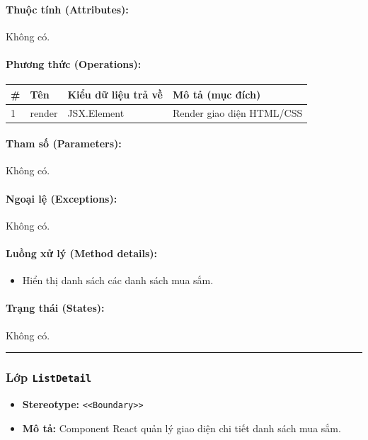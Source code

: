 \documentclass[12pt,a4paper]{article}
\begin{document}
\paragraph{Thuộc tính (Attributes):}
Không có.

\paragraph{Phương thức (Operations):}
\begin{longtable}{|p{0.6cm}|p{3.8cm}|p{2.6cm}|p{6.5cm}|}
\hline
\textbf{\#} & \textbf{Tên} & \textbf{Kiểu dữ liệu trả về} & \textbf{Mô tả (mục đích)} \\ \hline
\endhead
1 & render & JSX.Element & Render giao diện HTML/CSS \\ \hline
\end{longtable}

\paragraph{Tham số (Parameters):}
Không có.

\paragraph{Ngoại lệ (Exceptions):}
Không có.

\paragraph{Luồng xử lý (Method details):}
\begin{itemize}[leftmargin=*]
    \item Hiển thị danh sách các danh sách mua sắm.
\end{itemize}


\paragraph{Trạng thái (States):}
Không có.

\vskip 0.5cm
\noindent\rule{\textwidth}{0.5pt}
\vskip 0.5cm

\subsubsection{Lớp \texttt{ListDetail}}
\begin{itemize}[leftmargin=*]
    \item \textbf{Stereotype:} \texttt{\textless{}\textless{}Boundary\textgreater{}\textgreater{}}
    \item \textbf{Mô tả:} Component React quản lý giao diện chi tiết danh sách mua sắm.
\end{itemize}
\end{document}
